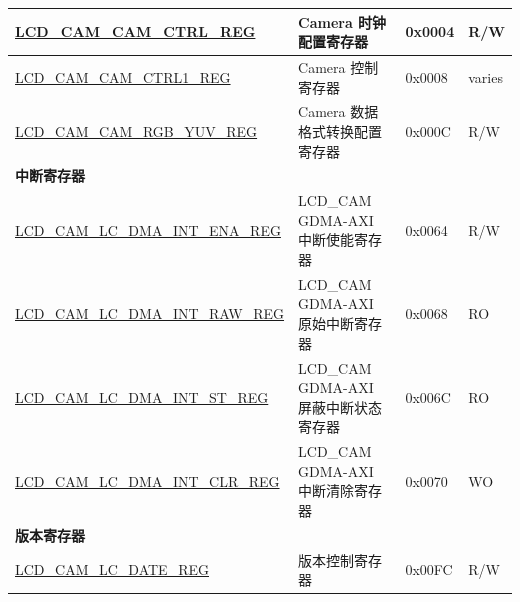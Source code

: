 \begin{longtable}{ | p{6.4cm} | p{6.8cm} | p{1.3cm} | p{1cm} | }
\hyperref[regdesc:LCDCAMCAMCTRLREG]{LCD\_CAM\_CAM\_CTRL\_REG} & Camera 时钟配置寄存器 & 0x0004 & R/W \\ \hline
\hyperref[regdesc:LCDCAMCAMCTRL1REG]{LCD\_CAM\_CAM\_CTRL1\_REG} & Camera 控制寄存器  & 0x0008 & varies \\ \hline
\hyperref[regdesc:LCDCAMCAMRGBYUVREG]{LCD\_CAM\_CAM\_RGB\_YUV\_REG} & Camera 数据格式转换配置寄存器 & 0x000C & R/W \\ \hline
\multicolumn{4}{|l|}{\textbf{中断寄存器}} \\ \hline
\hyperref[regdesc:LCDCAMLCDMAINTENAREG]{LCD\_CAM\_LC\_DMA\_INT\_ENA\_REG} & LCD\_CAM GDMA-AXI 中断使能寄存器 & 0x0064 & R/W \\ \hline
\hyperref[regdesc:LCDCAMLCDMAINTRAWREG]{LCD\_CAM\_LC\_DMA\_INT\_RAW\_REG} & LCD\_CAM GDMA-AXI 原始中断寄存器 & 0x0068 & RO \\ \hline
\hyperref[regdesc:LCDCAMLCDMAINTSTREG]{LCD\_CAM\_LC\_DMA\_INT\_ST\_REG} & LCD\_CAM GDMA-AXI 屏蔽中断状态寄存器 & 0x006C & RO \\ \hline
\hyperref[regdesc:LCDCAMLCDMAINTCLRREG]{LCD\_CAM\_LC\_DMA\_INT\_CLR\_REG} & LCD\_CAM GDMA-AXI 中断清除寄存器 & 0x0070 & WO \\ \hline
\multicolumn{4}{|l|}{\textbf{版本寄存器}} \\ \hline
\hyperref[regdesc:LCDCAMLCREGDATEREG]{LCD\_CAM\_LC\_DATE\_REG} & 版本控制寄存器 & 0x00FC & R/W \\ \hline
\end{longtable}
